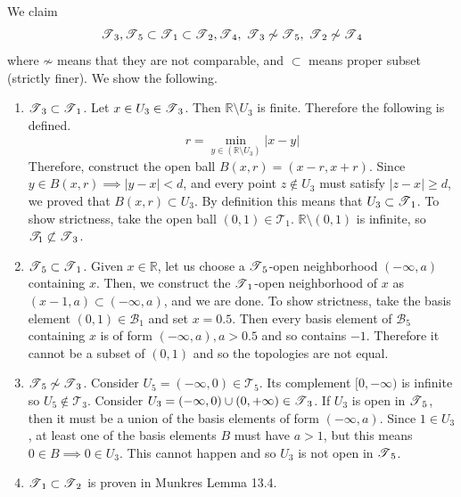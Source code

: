   \begin{solution}[Munkres 13.7]
    We claim 
    \begin{equation} 
      \operatorname{\mathscr{T}}_3, \operatorname{\mathscr{T}}_5 \subset \operatorname{\mathscr{T}}_1 \subset \operatorname{\mathscr{T}}_2, \operatorname{\mathscr{T}}_4, \; \operatorname{\mathscr{T}}_3 \not\sim \operatorname{\mathscr{T}}_5, \; \operatorname{\mathscr{T}}_2 \not\sim \operatorname{\mathscr{T}}_4
    \end{equation} 
    where $\not\sim$ means that they are not comparable, and $\subset$ means proper subset (strictly finer). We show the following. 
    \begin{enumerate}
      \item $\operatorname{\mathscr{T}}_3 \subset \operatorname{\mathscr{T}}_1$. Let $x \in U_3 \in \operatorname{\mathscr{T}}_3$. Then $\mathbb{R} \setminus U_3$ is finite. Therefore the following is defined. 
      \begin{equation}
        r = \min_{y \in (\mathbb{R} \setminus U_3)} |x - y| 
      \end{equation} 
      Therefore, construct the open ball $B(x, r) = (x - r, x + r)$. Since $y \in B(x, r) \implies |y - x| < d$, and every point $z \not\in U_3$ must satisfy $|z - x| \geq d$, we proved that $B(x, r) \subset U_3$. By definition this means that $U_3 \subset \operatorname{\mathscr{T}}_1$. To show strictness, take the open ball $(0, 1) \in \mathscr{T}_1$. $\mathbb{R} \setminus (0, 1)$ is infinite, so $\mathscr{T}_1 \not\subset \operatorname{\mathscr{T}}_3$.  

      \item $\operatorname{\mathscr{T}}_5 \subset \operatorname{\mathscr{T}}_1$. Given $x \in \mathbb{R}$, let us choose a $\operatorname{\mathscr{T}}_5$-open neighborhood $(-\infty, a)$ containing $x$. Then, we construct the $\operatorname{\mathscr{T}}_1$-open neighborhood of $x$ as $(x - 1, a) \subset (-\infty, a)$, and we are done. To show strictness, take the basis element $(0, 1) \in \mathscr{B}_1$ and set $x = 0.5$. Then every basis element of $\mathscr{B}_5$ containing $x$ is of form $(-\infty, a), a > 0.5$ and so contains $-1$. Therefore it cannot be a subset of $(0, 1)$ and so the topologies are not equal. 

      \item $\operatorname{\mathscr{T}}_5 \not\sim \operatorname{\mathscr{T}}_3$. Consider $U_5 = (-\infty, 0) \in \mathscr{T}_5$. Its complement $[0, -\infty)$ is infinite so $U_5 \not\in \mathscr{T}_3$. Consider $U_3 = (-\infty, 0) \cup (0, +\infty) \in \operatorname{\mathscr{T}}_3$. If $U_3$ is open in $\operatorname{\mathscr{T}}_5$, then it must be a union of the basis elements of form $(-\infty, a)$. Since $1 \in U_3$, at least one of the basis elements $B$ must have $a > 1$, but this means $0 \in B \implies 0 \in U_3$. This cannot happen and so $U_3$ is not open in $\operatorname{\mathscr{T}}_5$. 

      \item $\operatorname{\mathscr{T}}_1 \subset \operatorname{\mathscr{T}}_2$ is proven in Munkres Lemma 13.4.  


\end{enumerate}
\end{solution}
